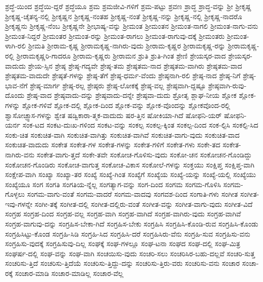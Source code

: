 {ಶ್ರದ್ಧೆ-ಯಿಂದ
ಶ್ರದ್ಧೆಯಿ-ದ್ದರೆ
ಶ್ರದ್ಧೆಯೂ
ಶ್ರಮ
ಶ್ರಮಜೀವಿ-ಗಳಿಗೆ
ಶ್ರಮ-ಪಟ್ಟು
ಶ್ರವಣ
ಶ್ರಾದ್ಧ
ಶ್ರಾದ್ಧ-ವನ್ನು
ಶ್ರೀ
ಶ್ರೀಕೃಷ್ಣ
ಶ್ರೀಕೃಷ್ಣ-ಚೈತನ್ಯ-ನಲ್ಲಿ
ಶ್ರೀಕೃಷ್ಣನ
ಶ್ರೀಕೃಷ್ಣ-ನಂತಹ
ಶ್ರೀಕೃಷ್ಣ-ನಂತೆ
ಶ್ರೀಕೃಷ್ಣ-ನನ್ನು
ಶ್ರೀಕೃಷ್ಣ-ನಲ್ಲಿ
ಶ್ರೀಕೃಷ್ಣ-ನಾದರೊ
ಶ್ರೀಕೃಷ್ಣನು
ಶ್ರೀಕೃಷ್ಣ-ನೆಂಬ
ಶ್ರೀಕೃಷ್ಣನೇ
ಶ್ರೀಭಾಷ್ಯ-ವನ್ನು
ಶ್ರೀಮಂತ
ಶ್ರೀಮಂತನ
ಶ್ರೀಮಂತ-ನಾಗಲಿ
ಶ್ರೀಮಂತ-ನಾಗು-ವನು
ಶ್ರೀಮಂತ-ನಿದ್ದರೆ
ಶ್ರೀಮಂತರ
ಶ್ರೀಮಂತ-ರನ್ನು
ಶ್ರೀಮಂತ-ರಾಗಲು
ಶ್ರೀಮಂತ-ರಾಗುವು-ದಕ್ಕೆ
ಶ್ರೀಮಂತರು
ಶ್ರೀಮಂತ-ಳಾಗಿ-ರಲಿ
ಶ್ರೀಮತಿ
ಶ್ರೀರಾಮ-ಕೃಷ್ಣ
ಶ್ರೀರಾಮಕೃಷ್ಣ-ನಾಗಿರು-ವುದು
ಶ್ರೀರಾಮ-ಕೃಷ್ಣರ
ಶ್ರೀರಾಮಕೃಷ್ಣ-ರನ್ನು
ಶ್ರೀರಾಮಕೃಷ್ಣ-ರಲ್ಲಿ
ಶ್ರೀರಾಮಕೃಷ್ಣರಿ-ಗಾದರೂ
ಶ್ರೀರಾಮ-ಕೃಷ್ಣರು
ಶ್ರೀರಾಮನ
ಶ್ರುತಿ
ಶ್ರುತಿ-ಗಿಂತ
ಶ್ರೇಣಿ
ಶ್ರೇಯಸ್ಕರ-ವಾದ
ಶ್ರೇಯಸ್ಕರ-ವಾದುದು
ಶ್ರೇಯ-ಸ್ಸಿನ
ಶ್ರೇಷ್ಠ
ಶ್ರೇಷ್ಠ-ಗದ್ಯವೇ
ಶ್ರೇಷ್ಠ-ತಮ
ಶ್ರೇಷ್ಠತಮ-ನಾದ
ಶ್ರೇಷ್ಠತಮ-ವಾಗಿರು
ಶ್ರೇಷ್ಠತಮ-ವಾದ
ಶ್ರೇಷ್ಠತಮ-ವಾದುದೇ
ಶ್ರೇಷ್ಠತೆ-ಗಳನ್ನು
ಶ್ರೇಷ್ಠ-ತೆಗೆ
ಶ್ರೇಷ್ಠ-ಧರ್ಮ-ವೆಂದು
ಶ್ರೇಷ್ಠನಾಗಿ-ರಲಿ
ಶ್ರೇಷ್ಠ-ನಾದ
ಶ್ರೇಷ್ಠ-ನಿಗೆ
ಶ್ರೇಷ್ಠ-ಭಾವ-ನೆಗೆ
ಶ್ರೇಷ್ಠ-ಮಾರ್ಗ
ಶ್ರೇಷ್ಠ-ರಲ್ಲ
ಶ್ರೇಷ್ಠರು
ಶ್ರೇಷ್ಠ-ಲೋಕಕ್ಕೆ
ಶ್ರೇಷ್ಠ-ವಲ್ಲ
ಶ್ರೇಷ್ಠವಾಗಿ-ದ್ದಷ್ಟೂ
ಶ್ರೇಷ್ಠವಾಗಿ-ರುವು-ದೊಂದು
ಶ್ರೇಷ್ಠ-ವಾದ
ಶ್ರೇಷ್ಠವಾದು-ದನ್ನು
ಶ್ರೇಷ್ಠವಾದು-ದನ್ನೇ
ಶ್ರೇಷ್ಠವಾ-ದುದು
ಶ್ರೋತೃ
ಶ್ಲಾಘ-ನೀಯ
ಶ್ಲೋಕ
ಶ್ಲೋಕ-ಗಳನ್ನು
ಶ್ಲೋಕ-ಗಳಿವೆ
ಶ್ಲೋಕ-ದಲ್ಲಿ
ಶ್ಲೋಕ-ದಿಂದ
ಶ್ಲೋಕ-ವನ್ನು
ಶ್ಲೋಕ-ವೊಂದನ್ನು
ಶ್ಲೋಕವೊಂದ-ರಲ್ಲಿ
ಶ್ವಾಸೋಚ್ಫ್ವಾಸ-ಗಳನ್ನು
ಶ್ವೇತ
ಷಡ್ವಿಕಾರಾ-ತ್ಮಕ-ವಾದುದು
ಷರ-ತ್ತಿನ
ಷೋಕಿಯಾ-ಗಿದೆ
ಷೋಫನಿ-ಯರ್
ಷೋಫನಿ-ಯರ್ನ
ಸಂಕ-ಟದ
ಸಂಕಟ-ದುಃಖ-ಗಳಿಂದ
ಸಂಕಟ-ವನ್ನು
ಸಂಕಲ್ಪ
ಸಂಕಲ್ಪ-ಕ್ಕಿಂತ
ಸಂಕಲ್ಪ-ದಿಂದ
ಸಂಕ-ಲ್ಪಿಸಿ
ಸಂಕಲ್ಪಿ-ಸಿದ
ಸಂಕು-ಚಿತ
ಸಂಕುಚಿತ-ವಾಗಿ
ಸಂಕುಚಿತ-ವಾಗಿತ್ತು
ಸಂಕುಚಿತ-ವಾಗಿವೆ
ಸಂಕುಚಿತ-ವಾಗು-ವುದು
ಸಂಕುಚಿತ-ವಾದ
ಸಂಕುಚಿತ-ವಾದುದು
ಸಂಕೇತ
ಸಂಕೇತ-ಗಳ
ಸಂಕೇತ-ಗಳನ್ನು
ಸಂಕೇತ-ಗಳಿಗೆ
ಸಂಕೇತ-ಗಳು
ಸಂಕೇ-ತದ
ಸಂಕೇತ-ನಾಗಿರು-ವನು
ಸಂಕೇತ-ವಾಗು-ತ್ತದೆ
ಸಂಕೇ-ತವೇ
ಸಂಕೋಚ-ಗೊಳಿಸು-ವುದು
ಸಂಕೋ-ಚನ
ಸಂಕೋಚನ-ಗೊಂಡಿದ್ದು
ಸಂಕೋಚನ-ಗೊಂಡಿರು
ಸಂಕೋಚ-ವಾಗುತ್ತ
ಸಂಕೋಚ-ವಿಕಾಸ
ಸಂಕೋಲೆ-ಗಳನ್ನು
ಸಂಕ್ತಯು
ಸಂಕ್ಷಿಪ್ತ
ಸಂಕ್ಷಿಪ್ತ-ವಾಗಿ
ಸಂಕ್ಷೇಪ-ವಾಗಿ
ಸಂಖ್ಯಾ
ಸಂಖ್ಯಾ-ತರ
ಸಂಖ್ಯೆ
ಸಂಖ್ಯೆ-ಗಿಂತ
ಸಂಖ್ಯೆಗೆ
ಸಂಖ್ಯೆಯ
ಸಂಖ್ಯೆ-ಯನ್ನು
ಸಂಖ್ಯೆ-ಯಲ್ಲಿ
ಸಂಖ್ಯೆಯು
ಸಂಖ್ಯೆಯೂ
ಸಂಗ
ಸಂಗತಿ
ಸಂಗತಿಯ-ನ್ನೆಲ್ಲ
ಸಂಗತ್ಯಾಗ-ವನ್ನು
ಸಂಗ-ದಿಂದ
ಸಂಗಮ
ಸಂಗಮ-ಗೊಳಿಸಿ
ಸಂಗಮ-ಗೊಳ್ಳಲು
ಸಂಗಮ-ವಾಗು-ವಂತೆ
ಸಂಗಮ-ವಾದರೆ
ಸಂಗಮ-ವಾದವು
ಸಂಗವಶ-ದಿಂದ
ಸಂಗಾತಿ-ಗಳು
ಸಂಗೀತ
ಸಂಗೀತ-ಇವು-ಗಳನ್ನೇ
ಸಂಗೀ-ತಕ್ಕೆ
ಸಂಗೀತ-ದಲ್ಲಿ
ಸಂಗೀತ-ದಲ್ಲಿರು-ವಂತೆ
ಸಂಗೀತ-ವನ್ನು
ಸಂಗೀತ-ವಾಗು-ವುದು
ಸಂಗೀತ-ವಿದೆ
ಸಂಗ್ರಹ
ಸಂಗ್ರಹ-ದಿಂದ
ಸಂಗ್ರಹ-ವಲ್ಲ
ಸಂಗ್ರಹ-ವಾಗಿ
ಸಂಗ್ರಹ-ವಾಗಿದೆ
ಸಂಗ್ರಹ-ವಾಗಿರು-ವುದು
ಸಂಗ್ರಹ-ವಾಗಿವೆ
ಸಂಗ್ರಹ-ವಾಗುವು-ದನ್ನು
ಸಂಗ್ರಹಿಸ-ಬೇಕಾ-ಗಿದೆ
ಸಂಗ್ರಹಿಸ-ಬೇಕು
ಸಂಗ್ರಹಿಸಿ
ಸಂಗ್ರಹಿಸಿ-ಕೊಂಡಿ-ರುವ
ಸಂಗ್ರಹಿಸಿ-ಕೊಂಡು
ಸಂಗ್ರಹಿಸಿಟ್ಟು-ಕೊಂಡ
ಸಂಗ್ರಹಿ-ಸಿಡಿ
ಸಂಗ್ರಹಿ-ಸಿದ
ಸಂಗ್ರಹಿಸಿ-ದರೆ
ಸಂಗ್ರಹಿಸಿರು-ವೆನು
ಸಂಗ್ರಹಿ-ಸುವ
ಸಂಗ್ರಹಿಸು-ವನು
ಸಂಗ್ರಹಿಸು-ವುದಕ್ಕೆ
ಸಂಗ್ರಹಿಸುವು-ದಿಲ್ಲ
ಸಂಘಕ್ಕೆ
ಸಂಘ-ಗಳಲ್ಲೂ
ಸಂಘ-ಟನಾ
ಸಂಘದ
ಸಂಘ-ದಲ್ಲಿ
ಸಂಘ-ಮಿತ್ರ
ಸಂಘರ್ಷ-ದಲ್ಲಿ
ಸಂಘ-ವನ್ನು
ಸಂಘ-ವಾಗಿ
ಸಂಚಯಿಸು-ವುದು
ಸಂಚರಿ-ಸಲು
ಸಂಚರಿಸಿರ-ಬಹು-ದಲ್ಲವೆ
ಸಂಚರಿ-ಸುತ್ತ
ಸಂಚರಿಸು-ತ್ತಿದೆ
ಸಂಚರಿಸು-ತ್ತಿದೆಯೆ
ಸಂಚರಿಸು-ತ್ತಿದ್ದು-ದನ್ನು
ಸಂಚರಿಸು-ತ್ತಿರು-ವರು
ಸಂಚರಿಸು-ವನು
ಸಂಚಾರ
ಸಂಚಾ-ರಕ್ಕೆ
ಸಂಚಾರ-ಮಾಡಿ
ಸಂಚಾರ-ಮಾಡಿಲ್ಲ
ಸಂಚಾರ-ವೆಲ್ಲ
}
